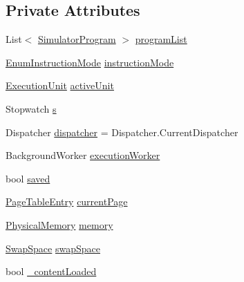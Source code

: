 \subsection*{Private Attributes}
\begin{DoxyCompactItemize}
\item 
List$<$ \hyperlink{class_c_p_u___o_s___simulator_1_1_c_p_u_1_1_simulator_program}{Simulator\+Program} $>$ \hyperlink{class_c_p_u___o_s___simulator_1_1_main_window_a48fa4dc074c098338a652dbd6a3434c7}{program\+List}
\item 
\hyperlink{namespace_c_p_u___o_s___simulator_adc17a5a5e004084f05dc8e4d3f70e31f}{Enum\+Instruction\+Mode} \hyperlink{class_c_p_u___o_s___simulator_1_1_main_window_adcf36837be53f52843bbeb354a16d15c}{instruction\+Mode}
\item 
\hyperlink{class_c_p_u___o_s___simulator_1_1_c_p_u_1_1_execution_unit}{Execution\+Unit} \hyperlink{class_c_p_u___o_s___simulator_1_1_main_window_af00ce05444d9636c688974f706ef397b}{active\+Unit}
\item 
Stopwatch \hyperlink{class_c_p_u___o_s___simulator_1_1_main_window_a880dc01f7c4f093b77ace064d93be1f3}{s}
\item 
Dispatcher \hyperlink{class_c_p_u___o_s___simulator_1_1_main_window_a5115439e688bb7ed25f5237b266e4f3f}{dispatcher} = Dispatcher.\+Current\+Dispatcher
\item 
Background\+Worker \hyperlink{class_c_p_u___o_s___simulator_1_1_main_window_a80e0a87480e4b7f4cfdb47739985b7c7}{execution\+Worker}
\item 
bool \hyperlink{class_c_p_u___o_s___simulator_1_1_main_window_afcd7446d65f9b9370ddf07499c2b8113}{saved}
\item 
\hyperlink{class_c_p_u___o_s___simulator_1_1_memory_1_1_page_table_entry}{Page\+Table\+Entry} \hyperlink{class_c_p_u___o_s___simulator_1_1_main_window_a14f6732faabdb632f3d29dbcbbb7059d}{current\+Page}
\item 
\hyperlink{class_c_p_u___o_s___simulator_1_1_memory_1_1_physical_memory}{Physical\+Memory} \hyperlink{class_c_p_u___o_s___simulator_1_1_main_window_a39a29cd60cb4ccbad0415a4e6d6414fa}{memory}
\item 
\hyperlink{class_c_p_u___o_s___simulator_1_1_memory_1_1_swap_space}{Swap\+Space} \hyperlink{class_c_p_u___o_s___simulator_1_1_main_window_ab9638abdc8d65670240a036bc02d813c}{swap\+Space}
\item 
bool \hyperlink{class_c_p_u___o_s___simulator_1_1_main_window_ae8269f86a68d5fdf06180686fc947cc6}{\+\_\+content\+Loaded}
\end{DoxyCompactItemize}


